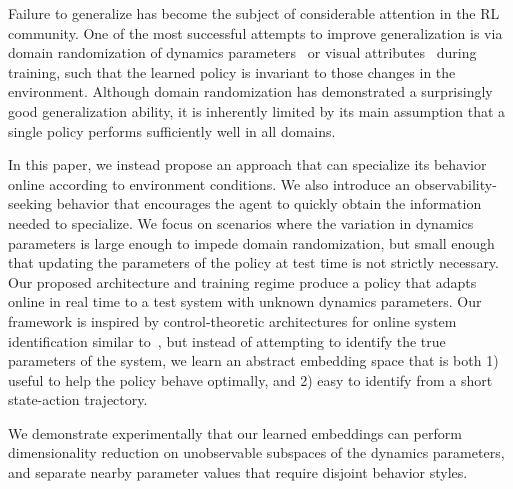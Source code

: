 \documentclass{article}
\newcommand{\TODO}[1]{\textcolor{red}{\textbf{TODO: #1}}}
\begin{document}
Failure to generalize has become the subject of considerable attention in the RL community.
One of the most successful attempts to improve generalization is via domain randomization of dynamics parameters~\citep{antonova-pivoting-corr17, zhu-RL-IL-diverse}
or visual attributes~\citep{sadeghi-cad2rl-rss17,tobin-domainrand-arxiv17,james-domain-xfer} during training, such that the learned policy is invariant to those changes in the environment.
Although domain randomization has demonstrated a surprisingly good generalization ability,
it is inherently limited by its main assumption that a single policy performs sufficiently well in all domains.


In this paper, we instead propose an approach that can specialize its behavior online according to environment conditions. 
We also introduce an observability-seeking behavior that encourages the agent to quickly obtain the information needed to specialize. 
We focus on scenarios where the variation in dynamics parameters
is large enough to impede domain randomization,
but small enough that updating the parameters of the policy at test time is not strictly necessary.
Our proposed architecture and training regime produce a policy
that adapts online in real time to a test system with unknown dynamics parameters.
Our framework is inspired by control-theoretic architectures for online system identification
similar to~\citet{yu-up-osi-rss17},
but instead of attempting to identify the true parameters of the system,
we learn an abstract embedding space that is both
1) useful to help the policy behave optimally, and
2) easy to identify from a short state-action trajectory.

We demonstrate experimentally that our learned embeddings can perform dimensionality reduction on unobservable subspaces of the dynamics parameters,
and separate nearby parameter values that require disjoint behavior styles.
\end{document}
